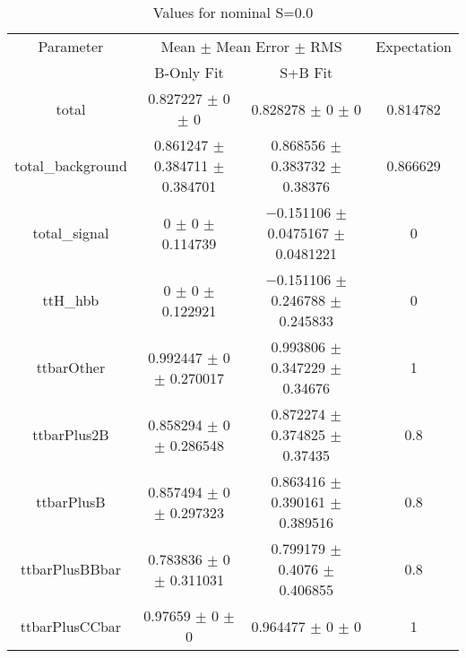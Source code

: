 \begin{table}
\centering
\caption{Values for nominal S=0.0}
\begin{tabular}{cccc}
\toprule
Parameter & \multicolumn{2}{c}{Mean $\pm$ Mean Error $\pm$ RMS} & Expectation\\
 & B-Only Fit & S+B Fit & \\
\midrule
total & \num{0.827227} $\pm$ \num{0} $\pm$ \num{0} & \num{0.828278} $\pm$ \num{0} $\pm$ \num{0} & \num{0.814782}\\
total\_background & \num{0.861247} $\pm$ \num{0.384711} $\pm$ \num{0.384701} & \num{0.868556} $\pm$ \num{0.383732} $\pm$ \num{0.38376} & \num{0.866629}\\
total\_signal & \num{0} $\pm$ \num{0} $\pm$ \num{0.114739} & \num{-0.151106} $\pm$ \num{0.0475167} $\pm$ \num{0.0481221} & \num{0}\\
ttH\_hbb & \num{0} $\pm$ \num{0} $\pm$ \num{0.122921} & \num{-0.151106} $\pm$ \num{0.246788} $\pm$ \num{0.245833} & \num{0}\\
ttbarOther & \num{0.992447} $\pm$ \num{0} $\pm$ \num{0.270017} & \num{0.993806} $\pm$ \num{0.347229} $\pm$ \num{0.34676} & \num{1}\\
ttbarPlus2B & \num{0.858294} $\pm$ \num{0} $\pm$ \num{0.286548} & \num{0.872274} $\pm$ \num{0.374825} $\pm$ \num{0.37435} & \num{0.8}\\
ttbarPlusB & \num{0.857494} $\pm$ \num{0} $\pm$ \num{0.297323} & \num{0.863416} $\pm$ \num{0.390161} $\pm$ \num{0.389516} & \num{0.8}\\
ttbarPlusBBbar & \num{0.783836} $\pm$ \num{0} $\pm$ \num{0.311031} & \num{0.799179} $\pm$ \num{0.4076} $\pm$ \num{0.406855} & \num{0.8}\\
ttbarPlusCCbar & \num{0.97659} $\pm$ \num{0} $\pm$ \num{0} & \num{0.964477} $\pm$ \num{0} $\pm$ \num{0} & \num{1}\\
\bottomrule
\end{tabular}
\end{table}